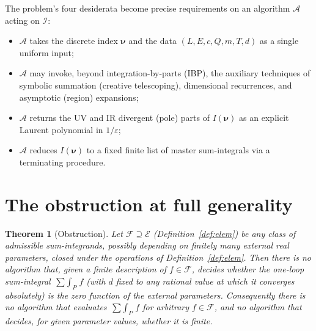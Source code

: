 \documentclass{amsart}
\newtheorem{theorem}{Theorem}
\theoremstyle{definition}
\begin{document}
The problem's four desiderata become precise requirements on an algorithm
$\mathcal A$ acting on $\mathcal I$:
\begin{itemize}
\item[(R1)] $\mathcal A$ takes the discrete index $\boldsymbol\nu$ and the
data $(L,E,c,Q,m,T,d)$ as a single uniform input;
\item[(R2)] $\mathcal A$ may invoke, beyond integration-by-parts (IBP),
the auxiliary techniques of symbolic summation (creative telescoping),
dimensional recurrences, and asymptotic (region) expansions;
\item[(R3)] $\mathcal A$ returns the UV and IR divergent (pole) parts of
$I(\boldsymbol\nu)$ as an explicit Laurent polynomial in $1/\varepsilon$;
\item[(R4)] $\mathcal A$ reduces $I(\boldsymbol\nu)$ to a fixed finite list of
master sum-integrals via a terminating procedure.
\end{itemize}

\section{The obstruction at full generality}

\begin{theorem}[Obstruction]\label{thm:obstruction}
Let $\mathcal F\supseteq\mathcal E$ (Definition~\ref{def:elem}) be any class of
admissible sum-integrands, possibly depending on finitely many external real
parameters, closed under the operations of Definition~\ref{def:elem}. Then
there is \emph{no} algorithm that, given a finite description of
$f\in\mathcal F$, decides whether the one-loop sum-integral
$\mathop{\sum\!\!\int}_P f$ (with $d$ fixed to any rational value at which it
converges absolutely) is the \emph{zero function} of the external parameters.
Consequently there is no algorithm that evaluates $\mathop{\sum\!\!\int}_P f$
for arbitrary $f\in\mathcal F$, and no algorithm that decides, for given
parameter values, whether it is finite.
\end{theorem}
\end{document}

